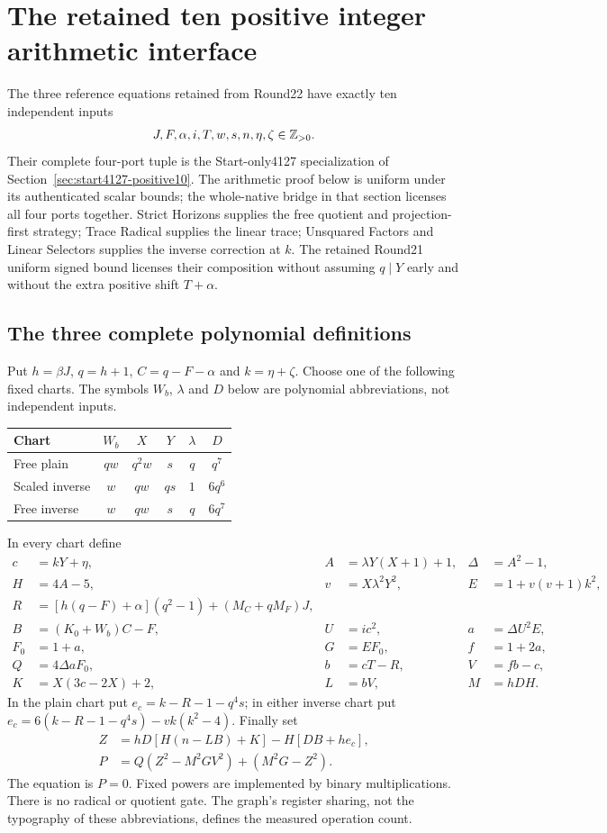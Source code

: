 \section{The retained ten positive integer arithmetic interface}
\label{sec:positive}
The three reference equations retained from Round22 have exactly ten independent inputs
\[
 J,F,\alpha,i,T,w,s,n,\eta,\zeta\in\mathbb Z_{>0}.
\]
Their complete four-port tuple is the Start-only4127 specialization
of Section~\ref{sec:start4127-positive10}. The arithmetic proof below is
uniform under its authenticated scalar bounds; the whole-native bridge
in that section licenses all four ports together. Strict Horizons
supplies the free quotient and projection-first strategy; Trace Radical
supplies the linear trace; Unsquared Factors and Linear Selectors
supplies the inverse correction at $k$. The retained Round21 uniform signed bound
licenses their composition without assuming $q\mid Y$ early and
without the extra positive shift $T+\alpha$.

\subsection{The three complete polynomial definitions}
Put $h=\beta J$, $q=h+1$, $C=q-F-\alpha$ and $k=\eta+\zeta$.
Choose one of the following fixed charts. The symbols $W_b$, $\lambda$
and $D$ below are polynomial abbreviations, not independent inputs.
\begin{center}\small
\begin{tabular}{@{}lccccc@{}}\toprule
Chart & $W_b$ & $X$ & $Y$ & $\lambda$ & $D$\\\midrule
Free plain & $qw$ & $q^2w$ & $s$ & $q$ & $q^7$\\
Scaled inverse & $w$ & $qw$ & $qs$ & $1$ & $6q^6$\\
Free inverse & $w$ & $qw$ & $s$ & $q$ & $6q^7$\\\bottomrule
\end{tabular}
\end{center}
In every chart define
\begin{align*}
 c&=kY+\eta,& A&=\lambda Y(X+1)+1,&\Delta&=A^2-1,\\
 H&=4A-5,&v&=X\lambda^2Y^2,&E&=1+v(v+1)k^2,\\
 R&=[h(q-F)+\alpha](q^2-1)+(M_C+qM_F)J,\\
 B&=(K_0+W_b)C-F,&U&=ic^2,&a&=\Delta U^2E,\\
 F_0&=1+a,&G&=EF_0,&f&=1+2a,\\
 Q&=4\Delta aF_0,&b&=cT-R,&V&=fb-c,\\
 K&=X(3c-2X)+2,&L&=bV,&M&=hDH.
\end{align*}
In the plain chart put $e_c=k-R-1-q^4s$; in either inverse chart put
$e_c=6(k-R-1-q^4s)-vk(k^2-4)$. Finally set
\begin{align}
 Z&=hD[H(n-LB)+K]-H[DB+he_c],\nonumber\\
 P&=Q(Z^2-M^2GV^2)+(M^2G-Z^2).\label{eq:positive-polynomial}
\end{align}
The equation is $P=0$. Fixed powers are implemented by binary
multiplications. There is no radical or quotient gate. The graph's
register sharing, not the typography of these abbreviations, defines
the measured operation count.

